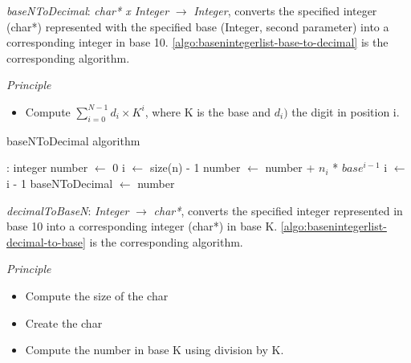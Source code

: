\documentclass[book, nodocumentinfo]{upmethodology-document}
\begin{document}

\emph{baseNToDecimal}: \emph{char* x Integer} \(\rightarrow\) \emph{Integer},
converts the specified integer (char*) represented with the specified base (Integer, second parameter) into a corresponding integer in base 10.
\ref{algo:basenintegerlist-base-to-decimal} is the corresponding algorithm.

\emph{Principle}
\begin{itemize}
    \item Compute \(\sum\limits_{i=0}^{N - 1}{d_i \times K^i}\), where K is the base and \(d_i)\) the digit in position i.
\end{itemize}

\begin{algorithm}[H]
    \label{algo:basenintegerlist-base-to-decimal}
    \caption{baseNToDecimal algorithm}

    \begin{algorithmic}
         : integer
            \State number \(\leftarrow\) 0
            \State i \(\leftarrow\) size(n) - 1
                \State number \(\leftarrow\) number + \(n_i\) * \(base^{i-1}\)
                \State i \(\leftarrow\) i - 1
            \EndWhile
            \State baseNToDecimal \(\leftarrow\) number
        \EndFunction
    \end{algorithmic}
\end{algorithm}

\emph{decimalToBaseN}: \emph{Integer} \(\rightarrow\) \emph{char*},
converts the specified integer represented in base 10 into a corresponding integer (char*) in base K.
\ref{algo:basenintegerlist-decimal-to-base} is the corresponding algorithm.

\emph{Principle}
\begin{itemize}
    \item Compute the size of the char
    \item Create the char
    \item Compute the number in base K using division by K.
\end{itemize}
\end{document}

